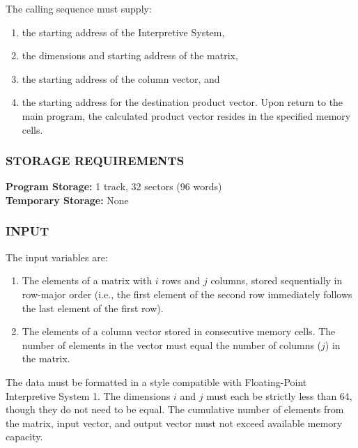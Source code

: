 \documentclass{article}
\begin{document}
The calling sequence must supply: 
\begin{enumerate}
	\item the starting address of the Interpretive System,
	\item the dimensions and starting address of the matrix,
	\item the starting address of the column vector, and
	\item the starting address for the destination product vector. Upon return to the main program, the calculated product vector resides in the specified memory cells.
\end{enumerate}

\subsubsection*{STORAGE REQUIREMENTS}
\noindent
\textbf{Program Storage:} 1 track, 32 sectors (96 words) \\
\textbf{Temporary Storage:} None

\subsubsection*{INPUT}
The input variables are:
\begin{enumerate}[label=\arabic*., leftmargin=1.5em, itemsep=2pt]
    \item The elements of a matrix with $i$ rows and $j$ columns, stored sequentially in row-major order (i.e., the first element of the second row immediately follows the last element of the first row).
    \item The elements of a column vector stored in consecutive memory cells. The number of elements in the vector must equal the number of columns ($j$) in the matrix.
\end{enumerate}
\noindent
The data must be formatted in a style compatible with Floating-Point Interpretive System 1. The dimensions $i$ and $j$ must each be strictly less than 64, though they do not need to be equal. The cumulative number of elements from the matrix, input vector, and output vector must not exceed available memory capacity.
\end{document}
